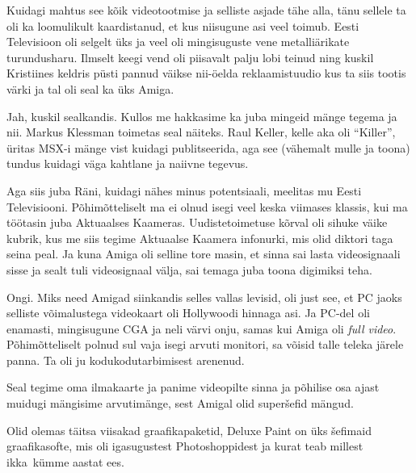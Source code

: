 Kuidagi mahtus see kõik videotootmise ja selliste asjade tähe alla, tänu sellele ta oli ka loomulikult kaardistanud, et kus niisugune asi veel toimub. Eesti Televisioon oli selgelt üks ja veel oli mingisuguste vene metalliärikate turundusharu. Ilmselt keegi vend oli piisavalt palju lobi teinud ning kuskil Kristiines  keldris püsti pannud väikse nii-öelda reklaamistuudio kus ta siis tootis värki ja tal oli seal ka üks Amiga. 


Jah, kuskil sealkandis. Kullos me hakkasime ka juba mingeid mänge tegema ja nii. Markus Klessman toimetas seal näiteks. Raul Keller, kelle aka oli \enquote{Killer}, üritas MSX-i mänge vist kuidagi publitseerida, aga see (vähemalt mulle ja toona) tundus kuidagi väga kahtlane ja naiivne tegevus.

Aga siis juba Räni, kuidagi nähes minus potentsiaali, meelitas mu Eesti Televisiooni. Põhimõtteliselt ma ei olnud isegi veel keska viimases klassis, kui ma töötasin juba Aktuaalses Kaameras. Uudistetoimetuse kõrval oli sihuke väike kubrik, kus me siis tegime Aktuaalse Kaamera infonurki, mis olid  diktori taga seina peal. Ja kuna Amiga oli selline tore masin, et  sinna sai lasta videosignaali sisse ja sealt tuli videosignaal välja, sai temaga juba toona digimiksi teha. 


Ongi. Miks need Amigad siinkandis selles vallas levisid, oli just see, et PC jaoks selliste võimalustega videokaart oli Hollywoodi hinnaga asi. Ja PC-del oli enamasti, mingisugune CGA ja neli värvi onju, samas kui Amiga oli \emph{full video}. Põhimõtteliselt polnud sul vaja isegi arvuti monitori, sa võisid talle teleka järele panna. Ta oli ju  kodukodutarbimisest arenenud. 

Seal tegime oma ilmakaarte ja panime videopilte sinna ja põhilise osa ajast muidugi mängisime arvutimänge, sest  Amigal olid superšefid mängud. 


Olid olemas täitsa viisakad graafikapaketid, Deluxe Paint on üks šefimaid graafikasofte, mis oli igasugustest Photoshoppidest ja kurat teab millest ikka kümme aastat ees. 

